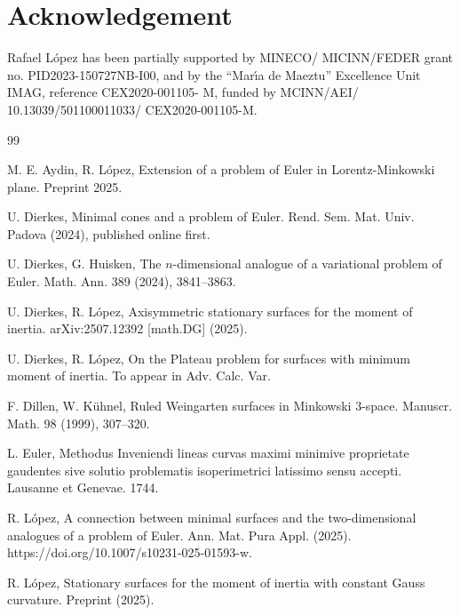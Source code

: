 \documentclass[a4paper,12pt]{amsart}
\theoremstyle{definition}
\begin{document}
\section*{Acknowledgement}

 
 Rafael L\'opez   has been partially supported by MINECO/ MICINN/FEDER grant no. PID2023-150727NB-I00, and by the ``Mar\'{\i}a de Maeztu'' Excellence Unit IMAG, reference CEX2020-001105- M, funded by MCINN/AEI/ 10.13039/501100011033/ CEX2020-001105-M.
   
  

\begin{thebibliography}{99}
 
  M. E. Aydin, R. L\'opez, Extension of a problem of Euler in    Lorentz-Minkowski plane. Preprint 2025. 
 
   U. Dierkes, Minimal cones and a problem of Euler.  Rend. Sem. Mat. Univ. Padova (2024), published online first.


   U. Dierkes,  G. Huisken,
The $n$-dimensional analogue of a variational problem of Euler. Math. Ann. 389 (2024), 3841--3863.

  U. Dierkes, R. L\'opez,   Axisymmetric stationary surfaces for the moment of inertia. arXiv:2507.12392 [math.DG] (2025).


 

 


 U. Dierkes, R. L\'opez,   On the Plateau problem for surfaces with minimum moment of inertia. To appear in Adv. Calc. Var. 
 

  F. Dillen, W. K\"{u}hnel, Ruled Weingarten surfaces in Minkowski 3-space. Manuscr. Math. 98 (1999), 307–320.  
 
 

 L. Euler, Methodus Inveniendi lineas curvas maximi minimive proprietate gaudentes sive solutio problematis isoperimetrici latissimo sensu accepti. Lausanne et Genevae. 1744.


 R. L\'opez, A connection between minimal surfaces and the two-dimensional analogues of a problem of Euler.	Ann. Mat. Pura Appl.  (2025). https://doi.org/10.1007/s10231-025-01593-w.

   R. L\'opez,   Stationary surfaces for   the moment of  inertia with constant Gauss curvature. Preprint (2025).

 
 
 

\end{thebibliography}
\end{document}
